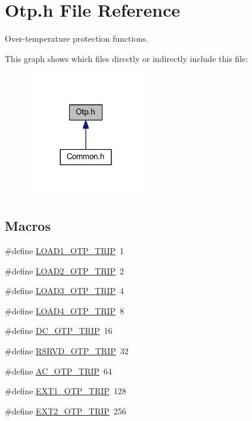 \hypertarget{a00034}{\section{Otp.\-h File Reference}
\label{a00034}
}


Over-\/temperature protection functions.  


This graph shows which files directly or indirectly include this file\-:\nopagebreak
\begin{figure}[H]
\begin{center}
\leavevmode
\includegraphics[width=144pt]{a00069}
\end{center}
\end{figure}
\subsection*{Macros}
\begin{DoxyCompactItemize}
\item 
\#define \hyperlink{a00034_a720054d07475f46293498641ca147dec}{L\-O\-A\-D1\-\_\-\-O\-T\-P\-\_\-\-T\-R\-I\-P}~1
\item 
\#define \hyperlink{a00034_a6a57d6c23509cd22be3a64fc25867f08}{L\-O\-A\-D2\-\_\-\-O\-T\-P\-\_\-\-T\-R\-I\-P}~2
\item 
\#define \hyperlink{a00034_a38b67fb04c7a94aea1d7a6cd71dcbdfb}{L\-O\-A\-D3\-\_\-\-O\-T\-P\-\_\-\-T\-R\-I\-P}~4
\item 
\#define \hyperlink{a00034_a11dc13a3236e2a227537278ccd45390d}{L\-O\-A\-D4\-\_\-\-O\-T\-P\-\_\-\-T\-R\-I\-P}~8
\item 
\#define \hyperlink{a00034_aabece239f4e25bd4b48f0535ff667c46}{D\-C\-\_\-\-O\-T\-P\-\_\-\-T\-R\-I\-P}~16
\item 
\#define \hyperlink{a00034_ab40204e9c76cfcc0d9f892050440e2e9}{R\-S\-R\-V\-D\-\_\-\-O\-T\-P\-\_\-\-T\-R\-I\-P}~32
\item 
\#define \hyperlink{a00034_a339a1358cf8dfd3ea7a81342bb32d399}{A\-C\-\_\-\-O\-T\-P\-\_\-\-T\-R\-I\-P}~64
\item 
\#define \hyperlink{a00034_a91ac28ba381b421811645935e398c8c4}{E\-X\-T1\-\_\-\-O\-T\-P\-\_\-\-T\-R\-I\-P}~128
\item 
\#define \hyperlink{a00034_acb47b2c45d5513cb21e25ae252a7bec1}{E\-X\-T2\-\_\-\-O\-T\-P\-\_\-\-T\-R\-I\-P}~256
\end{DoxyCompactItemize}
